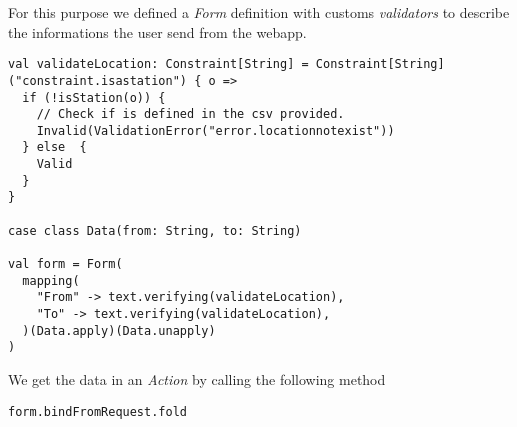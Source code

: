 \documentclass[a4paper,11pt]{article}
\begin{document}
For this purpose we defined a \emph{Form} definition with customs \emph{validators}
to describe the informations the user send from the webapp.

\begin{lstlisting}[style=scala]
val validateLocation: Constraint[String] = Constraint[String]("constraint.isastation") { o =>
  if (!isStation(o)) {
    // Check if is defined in the csv provided.
    Invalid(ValidationError("error.locationnotexist"))
  } else  {
    Valid
  }
}

case class Data(from: String, to: String)

val form = Form(
  mapping(
    "From" -> text.verifying(validateLocation),
    "To" -> text.verifying(validateLocation),
  )(Data.apply)(Data.unapply)
)
\end{lstlisting}

We get the data in an \emph{Action} by calling the following method

\begin{lstlisting}[style=scala]
form.bindFromRequest.fold
\end{lstlisting}




\end{document}
